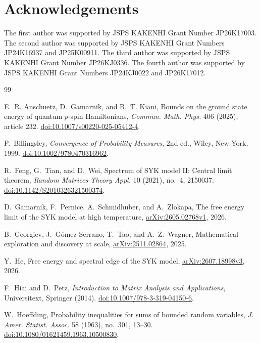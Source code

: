 \documentclass[11pt]{article}
\theoremstyle{remark}
\begin{document}
\section*{Acknowledgements}
  The first author was supported by JSPS KAKENHI Grant Number JP26K17003.
 The second author was supported by JSPS KAKENHI Grant Numbers JP24K16937 and JP25K00911. 
 The third author was supported by JSPS KAKENHI Grant Number JP26KJ0336. 
  The fourth author was supported by JSPS KAKENHI Grant Numbers JP24KJ0022 and JP26K17012.
\begin{thebibliography}{99}

E.~R. Anschuetz, D.~Gamarnik, and B.~T. Kiani,
\newblock Bounds on the ground state energy of quantum $p$-spin Hamiltonians,
\newblock \emph{Commun. Math. Phys.} 406 (2025), article 232.
\newblock \href{https://doi.org/10.1007/s00220-025-05412-4}
{doi:10.1007/s00220-025-05412-4}.



P.~Billingsley,
\newblock \emph{Convergence of Probability Measures},
\newblock 2nd ed., Wiley, New York, 1999.
\newblock \href{https://doi.org/10.1002/9780470316962}
{doi:10.1002/9780470316962}.

R.~Feng, G.~Tian, and D.~Wei,
\newblock Spectrum of SYK model II: Central limit theorem,
\newblock \emph{Random Matrices Theory Appl.} 10 (2021), no.~4, 2150037.
\newblock \href{https://doi.org/10.1142/S2010326321500374}
{doi:10.1142/S2010326321500374}.

D.~Gamarnik, F.~Pernice, A.~Schmidhuber, and A.~Zlokapa,
\newblock The free energy limit of the SYK model at high temperature,
\newblock \href{https://arxiv.org/abs/2605.02768}
{arXiv:2605.02768v1}, 2026.

B.~Georgiev, J.~G\'omez-Serrano, T.~Tao, and A.~Z.~Wagner,
\newblock Mathematical exploration and discovery at scale,
\newblock \href{https://arxiv.org/abs/2511.02864}
{arXiv:2511.02864}, 2025.

Y.~He,
\newblock Free energy and spectral edge of the SYK model,
\newblock \href{https://arxiv.org/abs/2607.18998}
{arXiv:2607.18998v3}, 2026.


F.~Hiai and D.~Petz,
\newblock \emph{Introduction to Matrix Analysis and Applications},
\newblock Universitext, Springer (2014).
\newblock \href{https://doi.org/10.1007/978-3-319-04150-6}
{doi:10.1007/978-3-319-04150-6}.

W.~Hoeffding,
\newblock Probability inequalities for sums of bounded random variables,
\newblock \emph{J. Amer. Statist. Assoc.} 58 (1963), no.~301, 13--30.
\newblock \href{https://doi.org/10.1080/01621459.1963.10500830}
{doi:10.1080/01621459.1963.10500830}.



\end{thebibliography}
\end{document}
